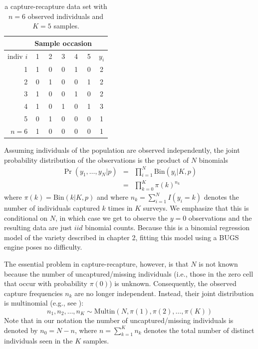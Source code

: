 \begin{table}
\centering
\caption{a capture-recapture data set with $n=6$ observed individuals
and $K=5$ samples.}
\begin{tabular}{r|ccccc|c}
&  \multicolumn{5}{c}{Sample occasion} &  \\ \hline
 indiv $i$ &  1 & 2 & 3 & 4 & 5 & $y_{i}$ \\ \hline
  1 &     1 & 0 & 0 & 1 & 0  & 2   \\
  2 &     0 & 1 & 0 & 0 & 1  & 2   \\
  3 &     1 & 0 & 0 & 1 & 0  & 2   \\
  4 &     1 & 0 & 1 & 0 & 1  & 3   \\
  5 &     0 & 1 & 0 & 0 & 0  & 1   \\
  $n=6$ & 1 & 0 & 0 & 0 & 0  & 1   \\ \hline
\end{tabular}
\label{tab.3.1}
\end{table}

Assuming individuals of the population are observed independently, the
joint probability distribution of the observations is the product of
$N$ binomials
\begin{eqnarray*}
  \Pr(y_1, \ldots, y_N | p) &=& \prod_{i=1}^N  \mathrm{Bin}(y_i | K, p) \\
   &=& \prod_{k=0}^K  \pi(k)^{n_k}
\end{eqnarray*}
where $\pi(k) = \mathrm{Bin}(k | K,p)$ and where $n_k = \sum_{i=1}^N
I(y_i = k)$ denotes the number of individuals captured $k$ times in
$K$ surveys. We emphasize that this is conditional on $N$, in which
case we get to observe the $y=0$ observations and the resulting data
are just $iid$ binomial counts. Because this is a binomial regression
model of the variety described in chapter 2, fitting this model using
a BUGS engine poses no difficulty.

The essential problem in capture-recapture, however, is that $N$ is
not known because the number of uncaptured/missing individuals (i.e.,
those in the zero cell that occur with probability $\pi(0)$) is
unknown.  Consequently, the observed capture frequencies $n_k$ are no
longer independent. Instead, their joint distribution is multinomial
(e.g., see \citet[][p. xyz]{illian_etal:2008}):
\begin{equation}
\label{eq:multinomialForM0}
    n_1, n_2, \ldots, n_K \sim \mathrm{Multin}(N, \pi(1), \pi(2), \ldots, \pi(K))
\end{equation}
Note that in our notation the number of uncaptured/missing individuals is
denoted by $n_0 = N - n$, where $n = \sum_{k=1}^K n_k$ denotes the total
number of distinct individuals seen in the $K$ samples.

